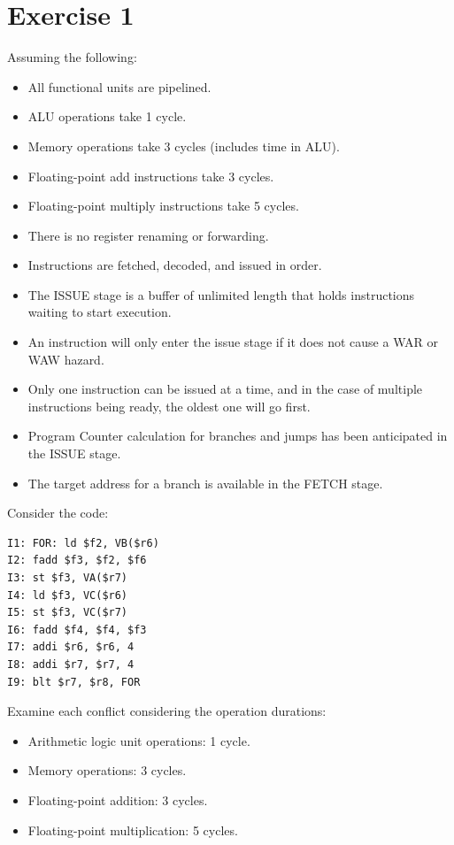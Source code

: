 \section{Exercise 1}

Assuming the following:
\begin{itemize}
    \item All functional units are pipelined.
    \item ALU operations take 1 cycle.
    \item Memory operations take 3 cycles (includes time in ALU).
    \item Floating-point add instructions take 3 cycles.
    \item Floating-point multiply instructions take 5 cycles.
    \item There is no register renaming or forwarding.
    \item Instructions are fetched, decoded, and issued in order.
    \item The ISSUE stage is a buffer of unlimited length that holds instructions waiting to start execution.
    \item An instruction will only enter the issue stage if it does not cause a WAR or WAW hazard.
    \item Only one instruction can be issued at a time, and in the case of multiple instructions being ready, the oldest one will go first.
    \item Program Counter calculation for branches and jumps has been anticipated in the ISSUE stage.
    \item The target address for a branch is available in the FETCH stage.
\end{itemize}
Consider the code:
\begin{verbatim}
I1: FOR: ld $f2, VB($r6)
I2: fadd $f3, $f2, $f6
I3: st $f3, VA($r7)
I4: ld $f3, VC($r6)
I5: st $f3, VC($r7)
I6: fadd $f4, $f4, $f3
I7: addi $r6, $r6, 4
I8: addi $r7, $r7, 4
I9: blt $r7, $r8, FOR
\end{verbatim}
Examine each conflict considering the operation durations:
\begin{itemize}
\item Arithmetic logic unit operations: 1 cycle.
\item Memory operations: 3 cycles.
\item Floating-point addition: 3 cycles.
\item Floating-point multiplication: 5 cycles.
\end{itemize}

